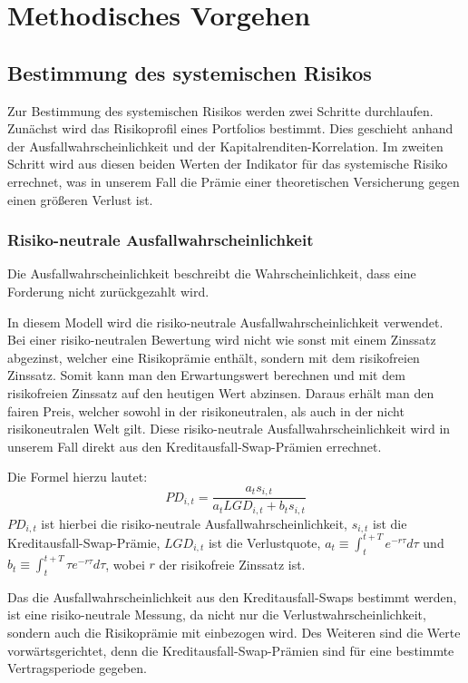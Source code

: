 \documentclass[a4paper,12pt]{scrartcl}
\begin{document}
\newpage
\newpage

\section{Methodisches Vorgehen}
\subsection{Bestimmung des systemischen Risikos}
Zur Bestimmung des systemischen Risikos werden zwei Schritte durchlaufen. Zunächst wird das Risikoprofil eines Portfolios bestimmt. Dies geschieht anhand der Ausfallwahrscheinlichkeit und der Kapitalrenditen-Korrelation.
Im zweiten Schritt wird aus diesen beiden Werten der Indikator für das systemische Risiko errechnet, was in unserem Fall die Prämie einer theoretischen Versicherung gegen einen größeren Verlust ist.
\subsubsection{Risiko-neutrale Ausfallwahrscheinlichkeit}
Die Ausfallwahrscheinlichkeit beschreibt die Wahrscheinlichkeit, dass eine Forderung nicht zurückgezahlt wird.

In diesem Modell wird die risiko-neutrale Ausfallwahrscheinlichkeit verwendet. Bei einer risiko-neutralen Bewertung wird nicht wie sonst mit einem Zinssatz abgezinst, welcher eine Risikoprämie enthält, sondern mit dem risikofreien Zinssatz. Somit kann man den Erwartungswert berechnen und mit dem risikofreien Zinssatz auf den heutigen Wert abzinsen. Daraus erhält man den fairen Preis, welcher sowohl in der risikoneutralen, als auch in der nicht risikoneutralen Welt gilt.
Diese risiko-neutrale Ausfallwahrscheinlichkeit wird in unserem Fall direkt aus den Kreditausfall-Swap-Prämien errechnet. 

Die Formel hierzu lautet: 
\begin{equation}
PD_{i,t}=\frac{a_t s_{i,t}}{a_t LGD_{i,t}+b_t s_{i,t}}
\end{equation}
$PD_{i,t}$ ist hierbei die risiko-neutrale Ausfallwahrscheinlichkeit, $s_{i,t}$ ist die Kreditausfall-Swap-Prämie, $LGD_{i,t}$ ist die Verlustquote, $a_t \equiv \int_{t}^{t+T} e^{-r \tau}d \tau$ und $b_t \equiv \int_{t}^{t+T} \tau e^{-r \tau}d \tau$, wobei $r$ der risikofreie Zinssatz ist.

Das die Ausfallwahrscheinlichkeit aus den Kreditausfall-Swaps bestimmt werden, ist eine risiko-neutrale Messung, da nicht nur die Verlustwahrscheinlichkeit, sondern auch die Risikoprämie mit einbezogen wird. Des Weiteren sind die Werte vorwärtsgerichtet, denn die Kreditausfall-Swap-Prämien sind für eine bestimmte Vertragsperiode gegeben. 
\end{document}
